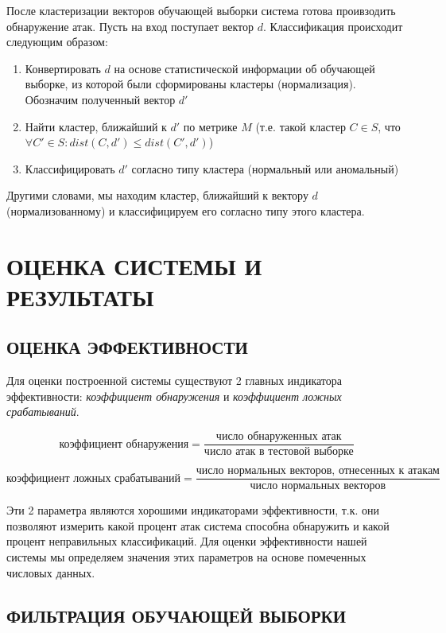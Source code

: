 \documentclass[12pt,a4paper]{article}
\begin{document}
После кластеризации векторов обучающей выборки система готова проивзодить
обнаружение атак. Пусть на вход поступает вектор $d$. Классификация происходит
следующим образом:

\begin{enumerate}

\item Конвертировать $d$ на основе статистической информации об обучающей выборке,
из которой были сформированы кластеры (нормализация). Обозначим полученный вектор $d'$

\item Найти кластер, ближайший к $d'$ по метрике $M$ (т.е. такой кластер $C \in S$, что
$\forall C' \in S : dist(C, d') \leq dist(C',d')$)

\item Классифицировать $d'$ согласно типу кластера (нормальный или аномальный)

\end{enumerate}

Другими словами, мы находим кластер, ближайший к вектору $d$ (нормализованному) и
классифицируем его согласно типу этого кластера.


\section{ОЦЕНКА СИСТЕМЫ И РЕЗУЛЬТАТЫ}

\subsection{ОЦЕНКА ЭФФЕКТИВНОСТИ}

Для оценки построенной системы существуют 2 главных индикатора эффективности: \textit{
коэффициент обнаружения} и \textit{коэффициент ложных срабатываний}.

$$\textit{коэффициент обнаружения}=\frac{\textit{число обнаруженных атак}}{\textit{число атак
в тестовой выборке}}$$

$$\textit{коэффициент ложных срабатываний}=\frac{\textit{число нормальных векторов, 
отнесенных к атакам}}{\textit{число нормальных векторов}}$$

Эти 2 параметра являются хорошими индикаторами эффективности, т.к. они позволяют измерить
какой процент атак система способна обнаружить и какой процент неправильных классификаций.
Для оценки эффективности нашей системы мы определяем значения этих параметров на основе
помеченных числовых данных.

\subsection{ФИЛЬТРАЦИЯ ОБУЧАЮЩЕЙ ВЫБОРКИ}
\end{document}
